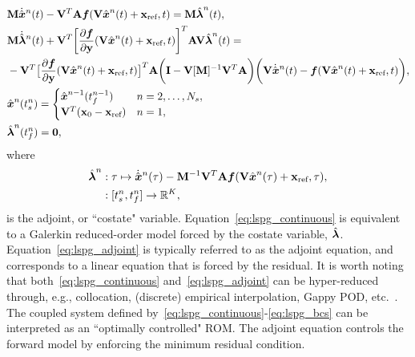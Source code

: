 \begin{align}\label{eq:lspg_continuous} 
&\mass   \genstateDotArg{n}{t}  -  \basisspace^T
\stweightingMatArgt{n}{t} \velocity(\veloargsromn) =  \mass \adjointArg{n}{t} , \\
 &\mass  \adjointDotArg{n}{t}  + \basisspace^T \bigg[\frac{\partial
\velocity}{\partial \stateyDiscrete} (\basisspace \genstateArg{n}{t} +
\stateIntercept,t) \bigg]^T \stweightingMatArgt{n}{t} \basisspace
 \adjointArg{n}{t} = \nonumber \\ &-\basisspace^T \big[
\frac{\partial \velocity}{\partial \stateyDiscrete}(\basisspace \genstateArg{n}{t} +
\stateIntercept,t) \big]^T \stweightingMatArgt{n}{t} \bigg( \mathbf{I} -
\basisspace [\massArgnt{n}]^{-1} \basisspace^T \stweightingMatArgt{n}{t} \bigg)
 \bigg( \basisspace \genstateDotArg{n}{t} -
\velocity(\veloargsromn) \bigg), \label{eq:lspg_adjoint} \\ &
\genstateArg{n}{\timeStartArg{n}} = \begin{cases}
\genstate^{n-1}(\timeEndArg{n-1}) & n=2,\ldots,\nslabs, \label{eq:lspg_bcs1}\\
\basisspace^T(\stateFOMIC - \stateIntercept) & n=1, \end{cases}\\ &
\adjointArg{n}{\timeEndArg{n}} = \boldsymbol 0, \label{eq:lspg_bcs} 
\end{align}
where 
\begin{equation}\label{eq:costate_def}
\begin{split}
\adjointArgnt{n} &: \timeDummy \mapsto \genstateDotArg{n}{\timeDummy}  -  \mass^{-1} \basisspace^T \stweightingMatArgt{n}{\timeDummy}\velocity(\basisspace \genstateArg{n}{\timeDummy} + \stateIntercept , \timeDummy ) ,\\
&: [\timeStartArg{n},\timeEndArg{n}] \rightarrow \RR{K} ,
\end{split}
\end{equation}
is the adjoint, or ``costate" variable. 
Equation~\eqref{eq:lspg_continuous} is equivalent to a Galerkin reduced-order
model forced by the costate variable, $\adjoint$.
Equation~\eqref{eq:lspg_adjoint} is typically referred to as the adjoint
equation, and corresponds to a linear equation that is forced by the residual.
It is worth noting that both~\eqref{eq:lspg_continuous}
and~\eqref{eq:lspg_adjoint} can be hyper-reduced through, e.g.,
collocation, (discrete) empirical interpolation, Gappy POD, etc.~\cite{everson_sirovich_gappy,eim,qdeim_drmac}. The
coupled system defined by~\eqref{eq:lspg_continuous}-\eqref{eq:lspg_bcs} can be interpreted as an ``optimally controlled"
ROM. The adjoint equation controls the forward model by enforcing the minimum
residual condition.

